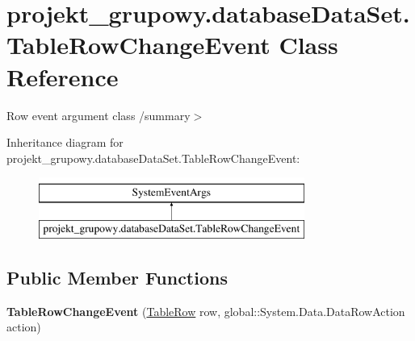 \hypertarget{classprojekt__grupowy_1_1database_data_set_1_1_table_row_change_event}{}\section{projekt\+\_\+grupowy.\+database\+Data\+Set.\+Table\+Row\+Change\+Event Class Reference}
\label{classprojekt__grupowy_1_1database_data_set_1_1_table_row_change_event}


Row event argument class /summary$>$  


Inheritance diagram for projekt\+\_\+grupowy.\+database\+Data\+Set.\+Table\+Row\+Change\+Event\+:\begin{figure}[H]
\begin{center}
\leavevmode
\includegraphics[height=2.000000cm]{classprojekt__grupowy_1_1database_data_set_1_1_table_row_change_event}
\end{center}
\end{figure}
\subsection*{Public Member Functions}
\begin{DoxyCompactItemize}
\item 
\mbox{\label{classprojekt__grupowy_1_1database_data_set_1_1_table_row_change_event_aee93ee140809170f422c34832af17cb5}} 
{\bfseries Table\+Row\+Change\+Event} (\hyperlink{classprojekt__grupowy_1_1database_data_set_1_1_table_row}{Table\+Row} row, global\+::\+System.\+Data.\+Data\+Row\+Action action)
\end{DoxyCompactItemize}
